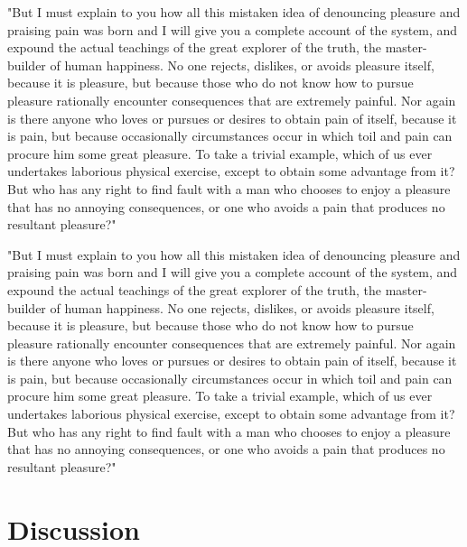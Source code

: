 \begin{refsection}
"But I must explain to you how all this mistaken idea of denouncing pleasure and praising pain was born and I will give you a complete account of the system, and expound the actual teachings of the great explorer of the truth, the master-builder of human happiness. No one rejects, dislikes, or avoids pleasure itself, because it is pleasure, but because those who do not know how to pursue pleasure rationally encounter consequences that are extremely painful. Nor again is there anyone who loves or pursues or desires to obtain pain of itself, because it is pain, but because occasionally circumstances occur in which toil and pain can procure him some great pleasure. To take a trivial example, which of us ever undertakes laborious physical exercise, except to obtain some advantage from it? But who has any right to find fault with a man who chooses to enjoy a pleasure that has no annoying consequences, or one who avoids a pain that produces no resultant pleasure?"

"But I must explain to you how all this mistaken idea of denouncing pleasure and praising pain was born and I will give you a complete account of the system, and expound the actual teachings of the great explorer of the truth, the master-builder of human happiness. No one rejects, dislikes, or avoids pleasure itself, because it is pleasure, but because those who do not know how to pursue pleasure rationally encounter consequences that are extremely painful. Nor again is there anyone who loves or pursues or desires to obtain pain of itself, because it is pain, but because occasionally circumstances occur in which toil and pain can procure him some great pleasure. To take a trivial example, which of us ever undertakes laborious physical exercise, except to obtain some advantage from it? But who has any right to find fault with a man who chooses to enjoy a pleasure that has no annoying consequences, or one who avoids a pain that produces no resultant pleasure?"


\section{Discussion}

\printbibliography[heading=subbibliography, title={References}] %
\end{refsection}

